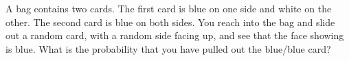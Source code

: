 A bag contains two cards. The first card is blue on one side and white on the other. The second card is blue on both sides. You reach into the bag and slide out a random card, with a random side facing up, and see that the face showing is blue. What is the probability that you have pulled out the blue/blue card?
